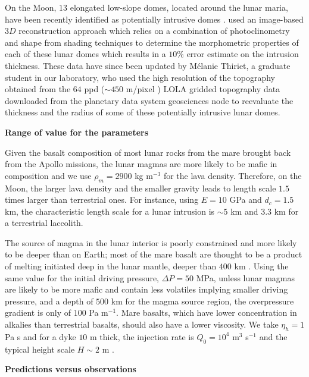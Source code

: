 On the Moon, $13$ elongated  low-slope domes, located around the lunar
maria, have  been recently  identified as potentially  intrusive domes
\citep{Wohler:2007it,Wohler:2009jj}.   \citet{Wohler:2009jj}  used  an
image-based $3D$ reconstruction approach which relies on a combination
of photoclinometry and shape from  shading techniques to determine the
morphometric properties of each of  these lunar domes which results in
a $10\%$  error estimate on  the intrusion thickness. These  data have
since  been updated  by Mélanie  Thiriet,  a graduate  student in  our
laboratory, who  used the high  resolution of the  topography obtained
from  the  $64$ ppd  ($\sim  450$  m/pixel \citep{Zuber:2009bq})  LOLA
gridded  topography data  downloaded  from the  planetary data  system
geosciences node to reevaluate the thickness and the radius of some of
these potentially intrusive lunar domes.

\vspace{.5cm} \textbf{Range of value for the parameters} \vspace{.5cm}

Given the basalt composition of most lunar rocks from the mare brought
back from the Apollo missions, the  lunar magmas are more likely to be
mafic in  composition and we use  $\rho_m = 2900$ kg  m$^{-3}$ for the
lava density. Therefore, on the Moon,  the larger lava density and the
smaller  gravity  leads  to  length  scale  $1.5$  times  larger  than
terrestrial ones. For  instance, using $E=10$ GPa and $d_c  = 1.5$ km,
the characteristic length  scale for a lunar intrusion is  $\sim 5$ km
and $3.3$ km for a terrestrial laccolith.

The source  of magma in the  lunar interior is poorly  constrained and
more likely to  be deeper than on  Earth; most of the  mare basalt are
thought to be a product of melting initiated deep in the lunar mantle,
deeper than $400$ km \citep{Shearer:2006gg}.  Using the same value for
the initial driving pressure, $\Delta P = 50$ MPa, unless lunar magmas
are  likely to  be  more  mafic and  contain  less volatiles  implying
smaller driving pressure, and a depth of $500$ km for the magma source
region, the overpressure  gradient is only of $100$  Pa m$^{-1}$. Mare
basalts, which  have lower concentration in  alkalies than terrestrial
basalts, should also have a lower  viscosity.  We take $\eta_h=1$ Pa s
and  for a  dyke  $10$ m  thick, the  injection  rate is  $Q_0=10^{4}$
m$^{3}$ s$^{-1}$ and the typical height scale $H\sim 2$ m .

\vspace{.5cm} \textbf{Predictions versus observations} \vspace{.5cm}

